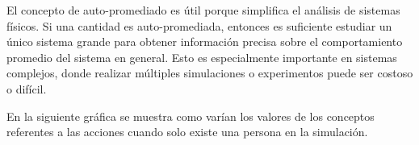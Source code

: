 El concepto de auto-promediado es útil porque simplifica el análisis de sistemas físicos. 
Si una cantidad es auto-promediada, entonces es suficiente estudiar un único sistema grande 
para obtener información precisa sobre el comportamiento promedio del sistema en general. 
Esto es especialmente importante en sistemas complejos, donde realizar múltiples simulaciones 
o experimentos puede ser costoso o difícil.






En la siguiente gráfica se muestra como varían los valores de los conceptos referentes a las acciones
cuando solo existe una persona en la simulación.

